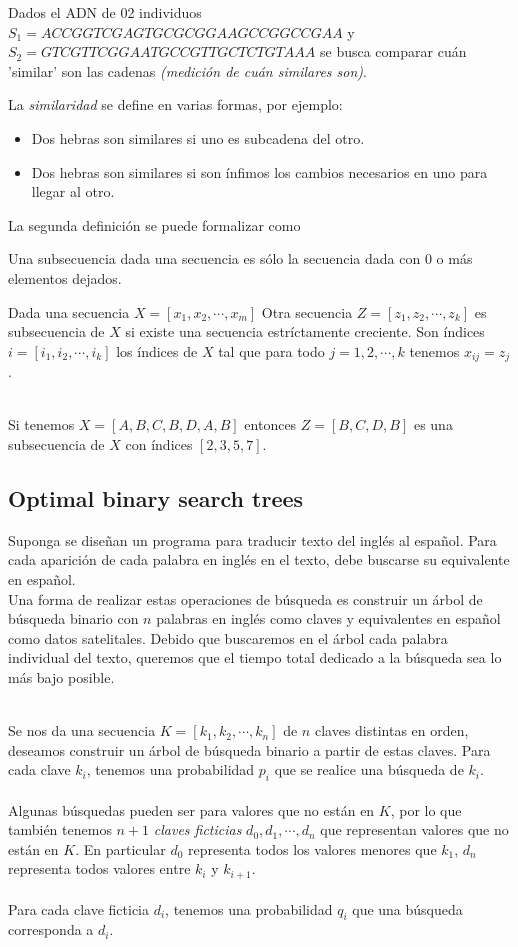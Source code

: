 \documentclass[tikz,11pt,fleqn]{book} %
\begin{document}
Dados el ADN de 02 individuos $S_1=ACCGGTCGAGTGCGCGGAAGCCGGCCGAA$ y $S_2=GTCGTTCGGAATGCCGTTGCTCTGTAAA$ se busca comparar cuán 'similar' son las cadenas \textit{(medición de cuán similares son)}.

La \textit{similaridad} se define en varias formas, por ejemplo:
\begin{itemize}
    \item Dos hebras son similares si uno es subcadena del otro.
    \item Dos hebras son similares si son ínfimos los cambios necesarios en uno para llegar al otro.
\end{itemize}
La segunda definición se puede formalizar como
\begin{definition}[Formalmente]
    Una subsecuencia dada una secuencia es sólo la secuencia dada con 0 o más elementos dejados. 

    Dada una secuencia $X=[x_1,x_2,\cdots,x_m]$
    Otra secuencia $Z=[z_1,z_2,\cdots,z_k]$ es subsecuencia de $X$ si existe una secuencia estríctamente creciente.
    Son índices $i=[i_1,i_2,\cdots,i_k]$ los índices de $X$ tal que para todo $j=1,2,\cdots,k$ tenemos $x_{ij}=z_j$.
\end{definition}
\begin{example}[]~\\
Si tenemos $X=[A,B,C,B,D,A,B]$ entonces $Z=[B,C,D,B]$ es una subsecuencia de $X$ con índices $[2,3,5,7]$. 
\end{example}


\subsection{Optimal binary search trees}
Suponga se diseñan un programa para traducir texto del inglés al español.
Para cada aparición de cada palabra en inglés en el texto, debe buscarse su equivalente en español.\\
Una forma de realizar estas operaciones de búsqueda es construir un árbol de búsqueda binario con $n$ palabras en inglés como claves y equivalentes en español como datos satelitales.
Debido que buscaremos en el árbol cada palabra individual del texto, queremos que el tiempo total dedicado a la búsqueda sea lo más bajo posible.

\begin{definition}[Formalmente]~\\
    Se nos da una secuencia $K=[k_1,k_2,\cdots,k_n]$ de $n$ claves distintas en orden, deseamos construir un árbol de búsqueda binario a partir de estas claves. Para cada  clave $k_i$, tenemos una probabilidad $p_i$ que se realice una búsqueda de $k_i$.\\\\
    Algunas búsquedas pueden ser para valores que no están en $K$, por lo que también tenemos $n+1$ \textit{claves ficticias} $d_0,d_1,\cdots,d_n$ que representan valores que no están en $K$. En particular $d_0$ representa todos los valores menores que $k_1$, $d_n$ representa todos valores entre $k_i$ y $k_{i+1}$.\\\\
    Para cada clave ficticia $d_i$, tenemos una probabilidad $q_i$ que una búsqueda corresponda a $d_i$.
\end{definition}
\end{document}
